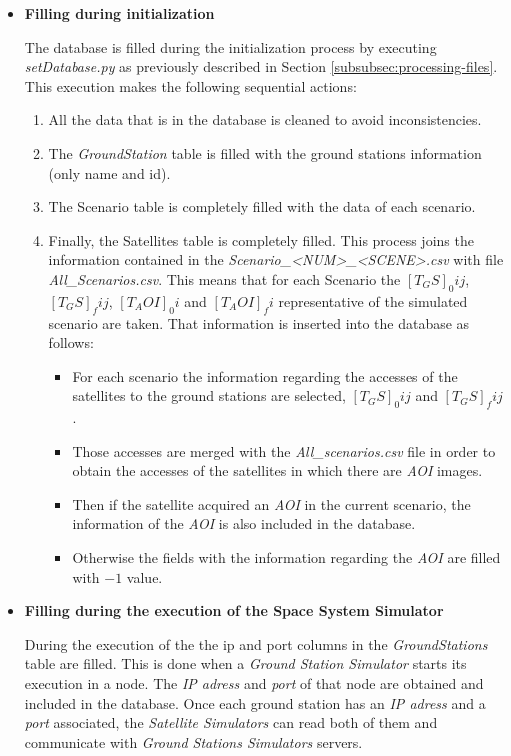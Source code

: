 \begin{itemize}

\item \textbf{Filling during initialization}

The database is filled during the initialization process by executing
\emph{setDatabase.py} as previously described in Section
\ref{subsubsec:processing-files}. This execution makes the following sequential
actions:
\begin{enumerate}
\item All the data that is in the database is cleaned to avoid inconsistencies.
\item The \emph{GroundStation} table is filled with the ground stations information (only name and id).
\item The Scenario table is completely filled with the data of each scenario.
\item Finally, the Satellites table is completely filled. This process joins the
  information contained in the \emph{Scenario\_<NUM>\_<SCENE>.csv} with file
  \emph{All\_Scenarios.csv}. This means that for each Scenario the $[T_GS]_0ij$,
  $[T_GS]_fij$,  $[T_AOI]_0i$ and $[T_AOI]_fi$ representative of the simulated
  scenario are taken. That information is inserted into the database as follows: 
\begin{itemize}
\item For each scenario the information regarding the accesses of the satellites to the ground stations are selected, $[T_GS]_0ij$ and $[T_GS]_fij$. 
\item Those accesses are merged with the \emph{All\_scenarios.csv} file in order to obtain the accesses of the satellites in which there are \emph{AOI} images. 
\item Then if the satellite acquired an \emph{AOI} in the current scenario, the information of the \emph{AOI} is also included in the database. 
\item Otherwise the fields with the information regarding the \emph{AOI} are filled
  with $-1$ value. 
\end{itemize}
\end{enumerate}

\item \textbf{Filling during the execution of the Space System Simulator}

During the execution of the \gsss the ip and port columns in the
\emph{GroundStations} table are filled. This is done when a \emph{Ground Station
  Simulator} starts its execution in a node. The \emph{IP adress} and
\emph{port} of that node are obtained and included in the database. Once each
ground station has an \emph{IP adress} and a \emph{port} associated, the \emph{Satellite Simulators} can read both of them and communicate with \emph{Ground Stations Simulators} servers.

\end{itemize}


